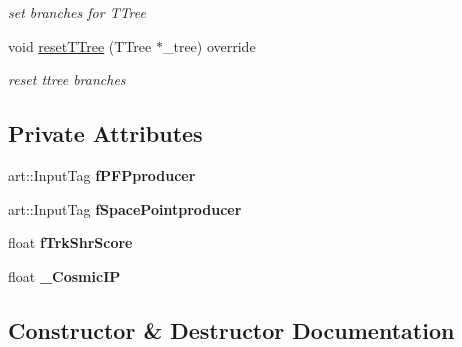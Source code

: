 \begin{DoxyCompactItemize}
\begin{DoxyCompactList}\small\item\em set branches for T\+Tree \end{DoxyCompactList}\item 
void \hyperlink{classanalysis_1_1CosmicIP_a0d921ff309b405e2a2ad668aee56c08b}{reset\+T\+Tree} (T\+Tree $\ast$\+\_\+tree) override\hypertarget{classanalysis_1_1CosmicIP_a0d921ff309b405e2a2ad668aee56c08b}{}\label{classanalysis_1_1CosmicIP_a0d921ff309b405e2a2ad668aee56c08b}

\begin{DoxyCompactList}\small\item\em reset ttree branches \end{DoxyCompactList}\end{DoxyCompactItemize}
\subsection*{Private Attributes}
\begin{DoxyCompactItemize}
\item 
art\+::\+Input\+Tag {\bfseries f\+P\+F\+Pproducer}\hypertarget{classanalysis_1_1CosmicIP_a9b6be9be6fb0f4bee6f49af8b1b68860}{}\label{classanalysis_1_1CosmicIP_a9b6be9be6fb0f4bee6f49af8b1b68860}

\item 
art\+::\+Input\+Tag {\bfseries f\+Space\+Pointproducer}\hypertarget{classanalysis_1_1CosmicIP_ae185a274823b69244a40f338300bbc02}{}\label{classanalysis_1_1CosmicIP_ae185a274823b69244a40f338300bbc02}

\item 
float {\bfseries f\+Trk\+Shr\+Score}\hypertarget{classanalysis_1_1CosmicIP_ad2a113ce491c0b974a96a9f6c639e5cf}{}\label{classanalysis_1_1CosmicIP_ad2a113ce491c0b974a96a9f6c639e5cf}

\item 
float {\bfseries \+\_\+\+Cosmic\+IP}\hypertarget{classanalysis_1_1CosmicIP_ab4c8609cc3b23ad7607e3cc3eeb9d38e}{}\label{classanalysis_1_1CosmicIP_ab4c8609cc3b23ad7607e3cc3eeb9d38e}

\end{DoxyCompactItemize}


\subsection{Constructor \& Destructor Documentation}
